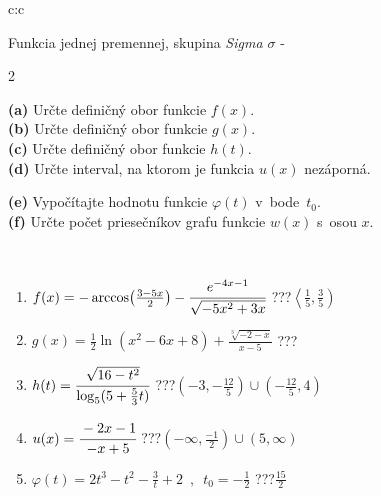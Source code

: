\documentclass[10pt]{report}
\begin{document}
\begin{tabular}{c:c}
\begin{minipage}[c][104.5mm][t]{0.5\linewidth}
\begin{center}
\vspace{7mm}
{\huge Funkcia jednej premennej, skupina \textit{Sigma $\sigma$} -}\\[5mm]
\begin{minipage}{0.95\linewidth}
\begin{center}
{\small \begin{multicols}{2} \raggedright
\textbf{(a)} Určte definičný obor funkcie \(f(x)\). \\[1mm]
\textbf{(b)} Určte definičný obor funkcie \(g(x)\). \\[1mm]
\textbf{(c)} Určte definičný obor funkcie \(h(t)\). \\[1mm]
\textbf{(d)} Určte interval, na ktorom je funkcia \(u(x)\) nezáporná. \par \columnbreak
\textbf{(e)} Vypočítajte hodnotu funkcie \(\varphi(t)\) v~bode~\(t_0\). \\[1mm]
\textbf{(f)} Určte počet priesečníkov grafu funkcie \(w(x)\) s~osou \(x\). \\[1mm]
\end{multicols}
}
\end{center}
\end{minipage}
\\[4mm]
\begin{minipage}{0.79\linewidth}
\begin{center}
\begin{varwidth}{\linewidth}
\begin{enumerate}
\small
\item $f(x) = -\arccos\!\left( \frac{3-5x}{2} \right) - \cfrac{e^{-4x-1}}{\sqrt{-5x^2+3x}}$\quad \dotfill\; ???\;\dotfill \quad $\left\langle\frac{1}{5} , \frac{3}{5}\right)$
\item $g(x) = \frac{1}{2} \ln{\!(x^2-6x+8)}+\frac{\sqrt[3]{-2-x}}{x-5}$\quad \dotfill\; ???\;\dotfill {}
\item $h(t) = \cfrac{\sqrt{16-t^2}}{\log_5(5+\frac{5}{3}t)}$\quad \dotfill\; ???\;\dotfill \quad $\left(-3 , -\frac{12}{5}\right)\cup\left(-\frac{12}{5} , 4\right)$
\item $u(x) = \cfrac{-2x-1}{-x+5}$\quad \dotfill\; ???\;\dotfill \quad $\left(-\infty , \frac{-1}{2}\right)\cup\left(5 , \infty\right)$
\item $\varphi(t) = 2t^3-t^2-\frac{3}{t}+2 \enspace , \enspace t_0=-\frac{1}{2}$\quad \dotfill\; ???\;\dotfill \quad $\frac{15}{2}$

\end{enumerate}
\end{varwidth}
\end{center}
\end{minipage}
\end{center}
\end{minipage}
\end{tabular}
\end{document}
